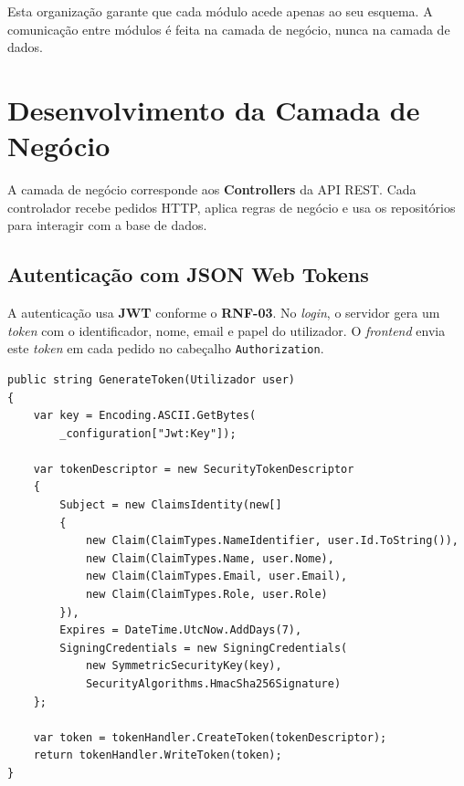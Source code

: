 Esta organização garante que cada módulo acede apenas ao seu esquema. A comunicação entre módulos é feita na camada de negócio, nunca na camada de dados.


\section{Desenvolvimento da Camada de Negócio}\label{sec:rel_backend}

A camada de negócio corresponde aos \textbf{Controllers} da API REST. Cada controlador recebe pedidos HTTP, aplica regras de negócio e usa os repositórios para interagir com a base de dados.

\subsection{Autenticação com JSON Web Tokens}

A autenticação usa \textbf{JWT} conforme o \textbf{RNF-03}. No \textit{login}, o servidor gera um \textit{token} com o identificador, nome, email e papel do utilizador. O \textit{frontend} envia este \textit{token} em cada pedido no cabeçalho \texttt{Authorization}.

\begin{lstlisting}[language={[Sharp]C},basicstyle=\ttfamily\small,breaklines=true,frame=single,caption={Geração de \textit{token} JWT com as \textit{claims} do utilizador.},label={lst:jwt}]
public string GenerateToken(Utilizador user)
{
    var key = Encoding.ASCII.GetBytes(
        _configuration["Jwt:Key"]);

    var tokenDescriptor = new SecurityTokenDescriptor
    {
        Subject = new ClaimsIdentity(new[]
        {
            new Claim(ClaimTypes.NameIdentifier, user.Id.ToString()),
            new Claim(ClaimTypes.Name, user.Nome),
            new Claim(ClaimTypes.Email, user.Email),
            new Claim(ClaimTypes.Role, user.Role)
        }),
        Expires = DateTime.UtcNow.AddDays(7),
        SigningCredentials = new SigningCredentials(
            new SymmetricSecurityKey(key),
            SecurityAlgorithms.HmacSha256Signature)
    };

    var token = tokenHandler.CreateToken(tokenDescriptor);
    return tokenHandler.WriteToken(token);
}
\end{lstlisting}

